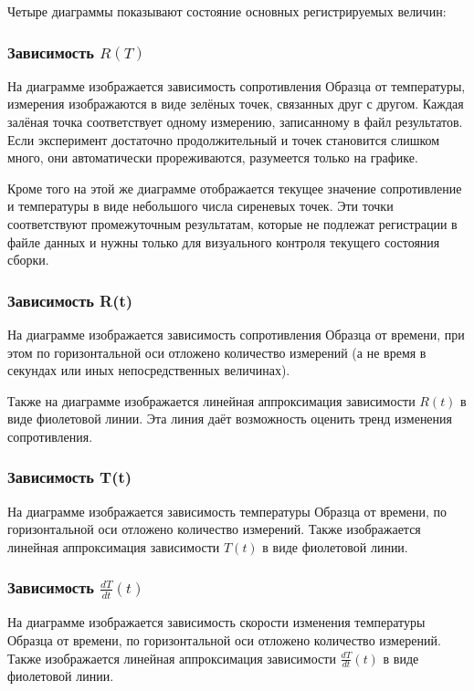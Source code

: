 \documentclass[12pt, a4paper, twocolumn]{report}
\begin{document}
Четыре диаграммы показывают состояние основных регистрируемых величин:

\subsubsection{Зависимость $R(T)$}

На диаграмме изображается зависимость сопротивления Образца от температуры, измерения изображаются в виде зелёных точек, связанных друг с другом. Каждая залёная точка соответствует одному измерению, записанному в файл результатов. Если эксперимент достаточно продолжительный и точек становится слишком много, они автоматически прореживаются, разумеется только на графике.

Кроме того на этой же диаграмме отображается текущее значение сопротивление и температуры в виде небольшого числа сиреневых точек. Эти точки соответствуют промежуточным результатам, которые не подлежат регистрации в файле данных и нужны только для визуального контроля текущего состояния сборки.

\subsubsection{Зависимость R(t)}

На диаграмме изображается зависимость сопротивления Образца от времени, при этом по горизонтальной оси отложено количество измерений (а не время в секундах или иных непосредственных величинах).

Также на диаграмме изображается линейная аппроксимация зависимости $R(t)$ в виде фиолетовой линии. Эта линия даёт возможность оценить тренд изменения сопротивления.

\subsubsection{Зависимость T(t)}

На диаграмме изображается зависимость температуры Образца от времени, по горизонтальной оси отложено количество измерений. Также изображается линейная аппроксимация зависимости $T(t)$ в виде фиолетовой линии.

\subsubsection{Зависимость $\frac{dT}{dt}(t)$}

На диаграмме изображается зависимость скорости изменения температуры Образца от времени, по горизонтальной оси отложено количество измерений. Также изображается линейная аппроксимация зависимости $\frac{dT}{dt}(t)$ в виде фиолетовой линии.
\end{document}
